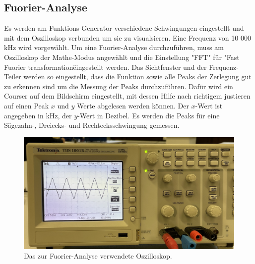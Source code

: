 \subsection{Fuorier-Analyse}
Es werden am Funktions-Generator verschiedene Schwingungen eingestellt und mit dem Oszilloskop verbunden um sie zu 
visualsieren. Eine Frequenz von 10 000\,kHz wird vorgewählt. Um eine Fuorier-Analyse durchzuführen, muss am Oszilloskop
der Mathe-Modus angewählt und die Einstellung "FFT" für "Fast Fuorier transformation\" eingestellt werden. Das Sichtfenster 
und der Frequenz-Teiler werden so eingestellt, dass die Funktion sowie alle Peaks der Zerlegung gut zu erkennen sind um die Messung der Peaks
durchzuführen. Dafür wird ein Courser auf dem Bildschirm eingestellt, mit dessen Hilfe nach richtigem justieren auf einen Peak
$x$ und $y$ Werte abgelesen werden können. Der $x$-Wert ist angegeben in kHz, der $y$-Wert in Dezibel. Es werden die Peaks für eine Sägezahn-,
Dreiecks- und Rechtecksschwingung gemessen.
\begin{figure}[H]
    \centering
    \includegraphics[scale=0.1]{Messdaten_Bilder/Oszilloskop.jpeg}
    \caption{Das zur Fuorier-Analyse verwendete Oszilloskop.}
    \label{fig:Oszilloskop}
\end{figure}